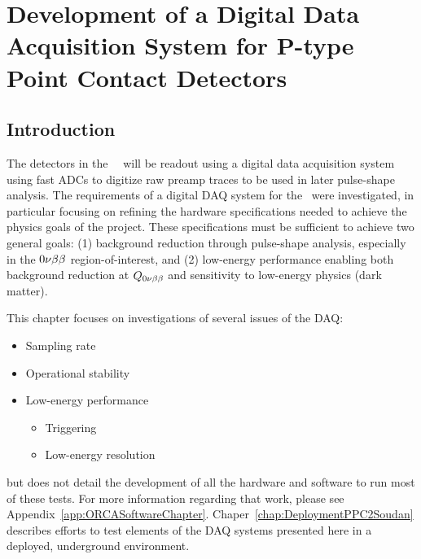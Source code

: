 %
%

\chapter{Development of a Digital Data Acquisition System for P-type Point Contact Detectors}
\label{chap:DAQDevel}
	\section{Introduction} 
	
	The detectors in the \MJ~\minmod~will be readout using a digital data acquisition system using fast ADCs to digitize raw preamp traces to be used in later pulse-shape analysis.  The requirements of a digital DAQ system for the \minmod~were investigated, in particular focusing on refining the hardware specifications needed to achieve the physics goals of the project.  These specifications must be sufficient to achieve two general goals: (1) background reduction through pulse-shape analysis, especially in the $0 \nu \beta \beta$ region-of-interest, and (2) low-energy performance enabling both background reduction at $Q_{0 \nu \beta \beta}$ and sensitivity to low-energy physics (dark matter).  
	
	 This chapter focuses on investigations of several issues of the DAQ:
		\begin{itemize}
			\item Sampling rate 
			\item Operational stability
			\item Low-energy performance
			\begin{itemize}
				\item Triggering
				\item Low-energy resolution
			\end{itemize}	
		\end{itemize}
but does not detail the development of all the hardware and software to run most of these tests.  For more information regarding that work, please see Appendix~\ref{app:ORCASoftwareChapter}.  Chaper~\ref{chap:DeploymentPPC2Soudan} describes efforts to test elements of the DAQ systems presented here in a deployed, underground environment.

